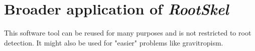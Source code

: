 \section{Broader application of \textit{RootSkel}}

This software tool can be reused for many purposes and is not restricted to root detection.
It might also be used for "easier" problems like gravitropism.

